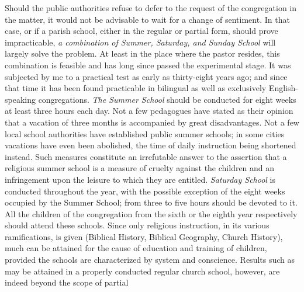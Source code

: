 Should the public authorities refuse to defer to the request of the congregation in the matter, it would not be advisable to wait for a change of sentiment. In that case, or if a parish school, either in the regular or partial form, should prove impracticable, \emph{a combination of Summer, Saturday, and Sunday School} will largely solve the problem. At least in the place where the pastor resides, this combination is feasible and has long since passed the experimental stage. It was subjected by me to a practical test as early as thirty-eight years ago; and since that time it has been found practicable in bilingual as well as exclusively English-speaking congregations. \emph{The Summer School} should be conducted for eight weeks at least three hours each day. Not a few pedagogues have stated as their opinion that a vacation of three months is accompanied by great disadvantages. Not a few local school authorities have established public summer schools; in some cities vacations have even been abolished, the time of daily instruction being shortened instead. Such measures constitute an irrefutable answer to the assertion that a religious summer school is a measure of cruelty against the children and an infringement upon the leisure to which they are entitled. \emph{Saturday School} is conducted throughout the year, with the possible exception of the eight weeks occupied by the Summer School; from three to five hours should be devoted to it. All the children of the congregation from the sixth or the eighth year respectively should attend these schools. Since only religious instruction, in its various ramifications, is given (Biblical History, Biblical Geography, Church History), much can be attained for the cause of education and training of children, provided the schools are characterized by system and conscience. Results such as may be attained in a properly conducted regular church school, however, are indeed beyond the scope of partial
